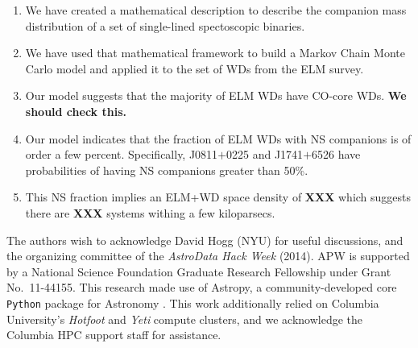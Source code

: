 \documentclass[letterpaper,12pt,preprint]{aastex}
\begin{document}
\begin{enumerate}
\item We have created a mathematical description to describe the companion mass distribution of a set of single-lined spectoscopic binaries. \\
\item We have used that mathematical framework to build a Markov Chain Monte Carlo model and applied it to the set of WDs from the ELM survey. \\
\item Our model suggests that the majority of ELM WDs have CO-core WDs. {\bf We should check this.} \\
\item Our model indicates that the fraction of ELM WDs with NS companions is of order a few percent. Specifically, J0811$+$0225 and J1741$+$6526 have probabilities of having NS companions greater than 50\%. \\
\item This NS fraction implies an ELM+WD space density of {\bf XXX} which suggests there are {\bf XXX} systems withing a few kiloparsecs.
\end{enumerate}

\acknowledgements
The authors wish to acknowledge David Hogg (NYU) for useful discussions, and the organizing committee of the \emph{AstroData Hack Week} (2014). 
APW is supported by a National Science Foundation Graduate Research Fellowship under Grant No.\ 11-44155. 
This research made use of Astropy, a community-developed core \texttt{Python} package for Astronomy \citep{astropy13}.
This work additionally relied on Columbia University's \emph{Hotfoot} and \emph{Yeti} compute clusters, and we acknowledge the Columbia HPC support staff for assistance. \\



\end{document}
